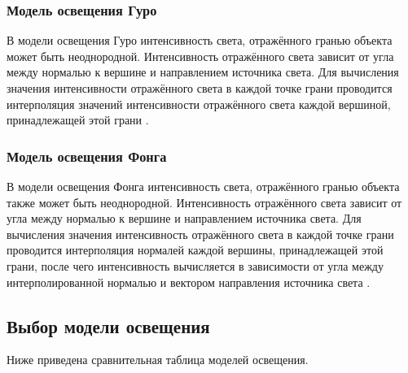 \subsubsection{Модель освещения Гуро}

В модели освещения Гуро интенсивность света, отражённого гранью объекта может быть неоднородной.
Интенсивность отражённого света зависит от угла между нормалью к вершине и направлением источника света.
Для вычисления значения интенсивности отражённого света в каждой точке грани проводится интерполяция значений интенсивности отражённого света каждой вершиной, принадлежащей этой грани \cite{aoaoa}.

\subsubsection{Модель освещения Фонга}

В модели освещения Фонга интенсивность света, отражённого гранью объекта также может быть неоднородной.
Интенсивность отражённого света зависит от угла между нормалью к вершине и направлением источника света.
Для вычисления значения интенсивность отражённого света в каждой точке грани проводится интерполяция нормалей каждой вершины, принадлежащей этой грани, после чего интенсивность вычисляется в зависимости от угла между интерполированной нормалью и вектором направления источника света \cite{aoaoa}.

\subsection*{Выбор модели освещения}

Ниже приведена сравнительная таблица моделей освещения.

